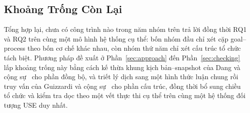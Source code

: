 \subsection{Khoảng Trống Còn Lại}\label{sec:rw-gap}

Tổng hợp lại, chưa có công trình nào trong năm nhóm trên trả lời đồng thời RQ1 và RQ2 trên cùng một
mô hình hệ thống cụ thể: bốn nhóm đầu chỉ xét cặp goal--process theo bốn cơ chế khác nhau, còn nhóm
thứ năm chỉ xét cấu trúc tổ chức tách biệt. Phương pháp đề xuất ở Phần~\ref{sec:approach} đến
Phần~\ref{sec:checking} lấp khoảng trống này bằng cách kế thừa khung kịch bản--snapshot của Dang và
cộng sự~\cite{dang2010jucs} cho phần đồng bộ, và triết lý dịch sang một hình thức luận chung rồi
truy vấn của Guizzardi và cộng sự~\cite{guizzardi2014vemi} cho phần cấu trúc, đồng thời bổ sung
chiều tổ chức và kiểm tra dọc theo một vết thực thi cụ thể trên cùng một hệ thống đối tượng USE duy
nhất.
